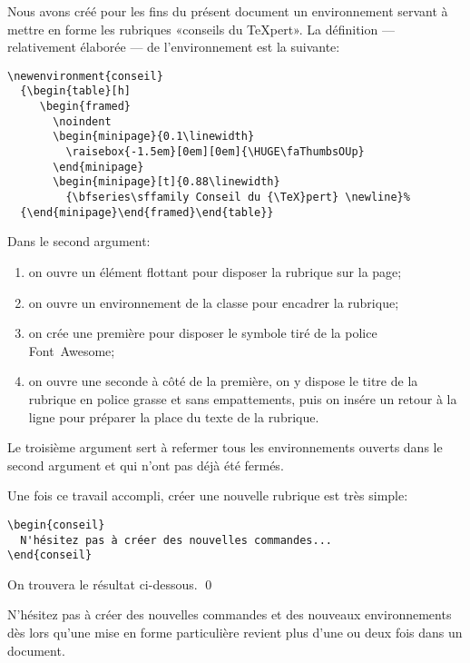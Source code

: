 \begin{exemple}
  Nous avons créé pour les fins du présent document un environnement
   servant à mettre en forme les rubriques «conseils du
  {\TeX}pert». La définition --- relativement élaborée --- de
  l'environnement est la suivante:
\begin{lstlisting}
\newenvironment{conseil}
  {\begin{table}[h]
     \begin{framed}
       \noindent
       \begin{minipage}{0.1\linewidth}
         \raisebox{-1.5em}[0em][0em]{\HUGE\faThumbsOUp}
       \end{minipage}
       \begin{minipage}[t]{0.88\linewidth}
         {\bfseries\sffamily Conseil du {\TeX}pert} \newline}%
  {\end{minipage}\end{framed}\end{table}}
\end{lstlisting}
  Dans le second argument:
  \begin{enumerate}
  \item on ouvre un élément flottant pour disposer la rubrique sur la
    page;
  \item on ouvre un environnement  de la classe
     pour encadrer la rubrique;
  \item on crée une première  pour disposer le symbole
    {\faThumbsOUp} tiré de la police Font~Awesome;
  \item on ouvre une seconde  à côté de la première, on y
    dispose le titre de la rubrique en police grasse et sans
    empattements, puis on insére un retour à la ligne pour préparer la
    place du texte de la rubrique.
  \end{enumerate}
  Le troisième argument sert à refermer tous les environnements
  ouverts dans le second argument et qui n'ont pas déjà été fermés.

  Une fois ce travail accompli, créer une nouvelle rubrique est très
  simple:
\begin{lstlisting}
\begin{conseil}
  N'hésitez pas à créer des nouvelles commandes...
\end{conseil}
\end{lstlisting}
  On trouvera le résultat ci-dessous. %
  \qed
\end{exemple}

\begin{conseil}
  N'hésitez pas à créer des nouvelles commandes et des nouveaux
  environnements dès lors qu'une mise en forme particulière revient
  plus d'une ou deux fois dans un document.
\end{conseil}


